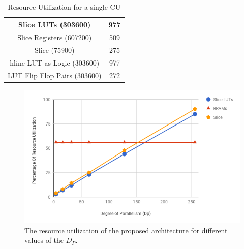 \begin{table}[t!]
\caption{Resource Utilization for a single CU}
\begin{center}
\begin{tabular}{ |c|c| }
  \hline
    Slice LUTs (303600) & 977 \\	\hline
    Slice Registers (607200) & 509\\	\hline
    Slice (75900) & 275	\\hline
    LUT as Logic (303600)& 977\\	\hline
    LUT Flip Flop Pairs (303600) & 272\\
  \hline
\end{tabular}

  \label{tab:2}
\end{center}
\end{table}

\begin{figure}[t!]
\begin{center}
\includegraphics[clip,width=1\linewidth]{Fig/Chart.png}
\caption{The resource utilization of the proposed architecture for different values of the $D_P$. }
\label{fig:ResourceUtil}
\end{center}
\end{figure}



